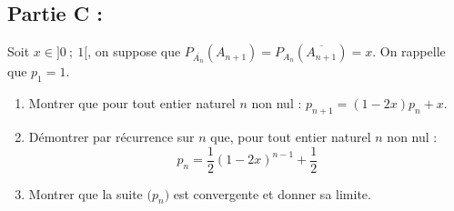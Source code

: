 \subsection*{Partie C :}

Soit $x \in ]0 ~;~ 1[$, on suppose que $P_{\overline{A_{n}}}\left(A_{n+1}\right)=P_{A_{n}}\left(\overline{A_{n+1}}\right)=x$. On rappelle que $p_{1}=1$.

\begin{enumerate}
\item Montrer que pour tout entier naturel $n$ non nul : $p_{n+1}=(1 - 2x) p_{n}+x$.

\item Démontrer par récurrence sur $n$ que, pour tout entier naturel $n$ non nul :
		\[p_{n}=\dfrac{1}{2}(1-2 x)^{n-1}+\dfrac{1}{2}\]

\item Montrer que la suite $\big(p_{n}\big)$ est convergente et donner sa limite.
\end{enumerate}
